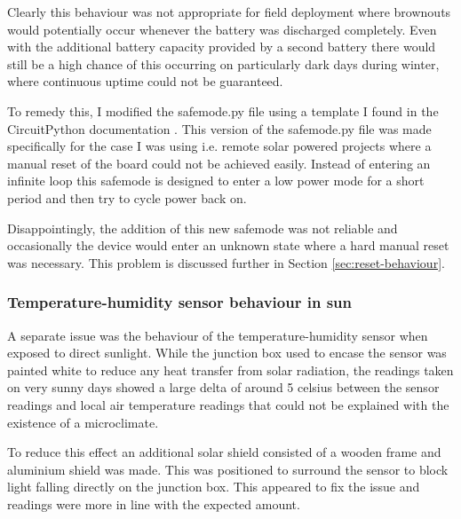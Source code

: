 Clearly this behaviour was not appropriate for field deployment where brownouts
would potentially occur whenever the battery was discharged completely. Even
with the additional battery capacity provided by a second battery there would
still be a high chance of this occurring on particularly dark days during
winter, where continuous uptime could not be guaranteed.

To remedy this, I modified the safemode.py file using a template I found in the
CircuitPython documentation \cite{halbert2023safemode}. This version of the
safemode.py file was made specifically for the case I was using i.e. remote
solar powered projects where a manual reset of the board could not be achieved
easily. Instead of entering an infinite loop this safemode is designed to enter
a low power mode for a short period and then try to cycle power back on.

Disappointingly, the addition of this new safemode was not reliable and
occasionally the device would enter an unknown state where a hard manual reset
was necessary. This problem is discussed further in Section
\ref{sec:reset-behaviour}.

\subsubsection{Temperature-humidity sensor behaviour in sun}

A separate issue was the behaviour of the temperature-humidity sensor when
exposed to direct sunlight. While the junction box used to encase the sensor was
painted white to reduce any heat transfer from solar radiation, the readings
taken on very sunny days showed a large delta of around 5 celsius between the
sensor readings and local air temperature readings that could not be explained
with the existence of a microclimate.

To reduce this effect an additional solar shield consisted of a wooden frame and
aluminium shield was made. This was positioned to surround the sensor to block
light falling directly on the junction box. This appeared to fix the issue and
readings were more in line with the expected amount.
